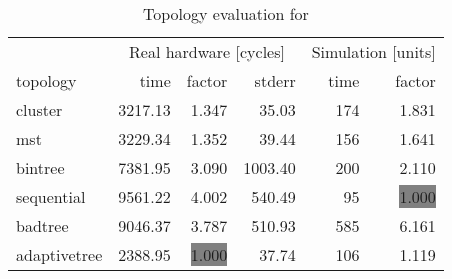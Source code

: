 \begin{table}[htb]
  \centering
  \begin{tabular}{lrrrrr}
  \toprule
  & \multicolumn{3}{c}{Real hardware [cycles]} & \multicolumn{2}{c}{Simulation [units]} \\
  topology & time & factor & stderr & time & factor \\
  \midrule
  cluster & 3217.13 & 1.347 & 35.03 & 174 & 1.831 \\
  mst & 3229.34 & 1.352 & 39.44 & 156 & 1.641 \\
  bintree & 7381.95 & 3.090 & 1003.40 & 200 & 2.110 \\
  sequential & 9561.22 & 4.002 & 540.49 & 95 & \colorbox{gray}{1.000} \\
  badtree & 9046.37 & 3.787 & 510.93 & 585 & 6.161 \\
  adaptivetree & 2388.95 & \colorbox{gray}{1.000} & 37.74 & 106 & 1.119 \\
  \midrule
  \end{tabular}
  \caption{Topology evaluation for \gottardo}
  \label{tab:gottardo}
\end{table}
